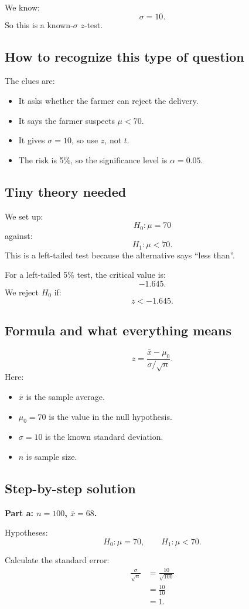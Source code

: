 \documentclass[11pt,a4paper]{article}
\begin{document}
We know:
\[
\sigma=10.
\]
So this is a known-\(\sigma\) \(z\)-test.

\subsection*{How to recognize this type of question}
The clues are:
\begin{itemize}[leftmargin=*]
    \item It asks whether the farmer can reject the delivery.
    \item It says the farmer suspects \(\mu<70\).
    \item It gives \(\sigma=10\), so use \(z\), not \(t\).
    \item The risk is 5\%, so the significance level is \(\alpha=0.05\).
\end{itemize}

\subsection*{Tiny theory needed}
We set up:
\[
H_0:\mu=70
\]
against:
\[
H_1:\mu<70.
\]
This is a left-tailed test because the alternative says ``less than''.

For a left-tailed 5\% test, the critical value is:
\[
-1.645.
\]
We reject \(H_0\) if:
\[
z<-1.645.
\]

\subsection*{Formula and what everything means}
\[
z=\frac{\bar{x}-\mu_0}{\sigma/\sqrt{n}}.
\]
Here:
\begin{itemize}[leftmargin=*]
    \item \(\bar{x}\) is the sample average.
    \item \(\mu_0=70\) is the value in the null hypothesis.
    \item \(\sigma=10\) is the known standard deviation.
    \item \(n\) is sample size.
\end{itemize}

\subsection*{Step-by-step solution}
\textbf{Part a: \(n=100\), \(\bar{x}=68\).}

Hypotheses:
\[
H_0:\mu=70,\qquad H_1:\mu<70.
\]

Calculate the standard error:
\begin{align*}
\frac{\sigma}{\sqrt{n}}
&=\frac{10}{\sqrt{100}}\\
&=\frac{10}{10}\\
&=1.
\end{align*}
\end{document}
